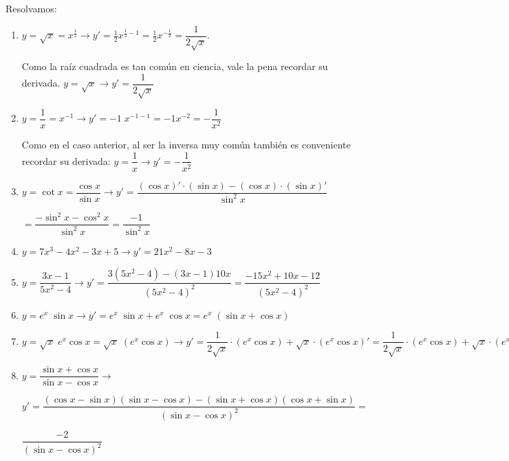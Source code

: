 	
	
	\begin{proofw}\renewcommand{\qedsymbol}{$\diamond$}
	
	Resolvamos:
		
		\begin{enumerate}
			\item $y=\sqrt{x}=x^{\frac 1 2} \to y'=\frac 1 2 x^{\frac 1 2 - 1}= \frac 1 2 x^{-\frac 1 2}= \dfrac {1}{2 \sqrt {x}}$. 
			
			Como la raíz cuadrada es tan común en ciencia, vale la pena recordar su derivada. $y=\sqrt{x} \to y'=\dfrac {1}{2 \sqrt {x}}$
			\item $y=\dfrac 1 x = x^{-1}\to y'=-1\; x^{-1-1}=-1 x^{-2}=-\dfrac 1 {x^2}$
			
			Como en el caso anterior, al ser la inversa muy común también es conveniente recordar su derivada: $y=\dfrac 1 x \to y'=-\dfrac 1 {x^2}$
			
			\item $y=\cot x=\dfrac {\cos x}{\sin x} \to y'=\dfrac {(\cos x)'\cdot (\sin x) - (\cos x)\cdot (\sin x)' }{\sin^2 x}$
			
			$=\dfrac {-\sin^2 x - \cos^2 x}{\sin^2 x}= \dfrac {-1}{\sin^2 x}$
			
			\item $y=7x^3-4x^2-3x+5 \to y'=21x^2-8x-3$
			
			\item $y=\dfrac {3x-1}{5x^2-4} \to y'=\dfrac {3(5x^2-4)-(3x-1)10x}{(5x^2-4)^2}=\dfrac {-15x^2+10x-12}{(5x^2-4)^2}$
			
			\item $y=e^x \; \sin x \to y'= e^x \; \sin x +e^x \; \cos x=e^x\; (\sin x + \cos x) $
			
			\item $y=\sqrt{x} \; e^x \cos x = \sqrt{x} \; (e^x \cos x) \to y'= \dfrac {1}{2 \sqrt{x}}\cdot (e^x \cos x) + \sqrt{x} \cdot (e^x \cos x)' = \dfrac {1}{2 \sqrt{x}}\cdot (e^x \cos x) + \sqrt{x} \cdot (e^x \cos x + e^x (-\sin x)) = \dfrac {1}{2 \sqrt{x}}\cdot (e^x \cos x) + \sqrt{x} \cdot (e^x \cos x - e^x \sin x)$
			
			\item $y=\dfrac {\sin x + \cos x}{\sin x - \cos x} \to $
			
			$y'=\dfrac {(\cos x - \sin x)(\sin x - \cos x)-(\sin x + \cos x)(\cos x + \sin x)}{(\sin x - \cos x)^2}=$
			
			$\dfrac {-2}{(\sin x - \cos x)^2}$
			
		\end{enumerate}
		
	\end{proofw}

